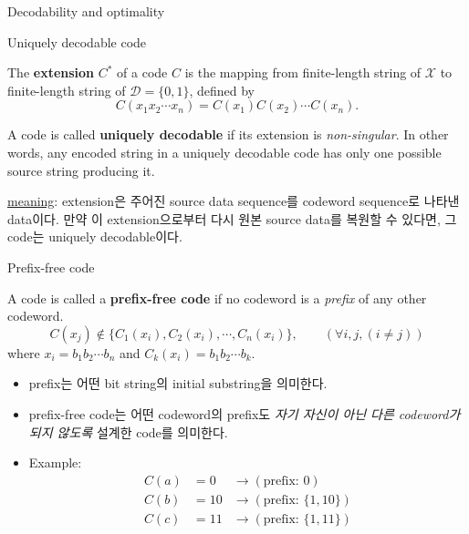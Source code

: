 \documentclass[9pt]{beamer}
\begin{document}
    \begin{section}{Decodability and optimality}
        \begin{frame}{Uniquely decodable code}
            \begin{definition}[extension]
                The \textbf{extension} $C^*$ of a code $C$ is the mapping from finite-length string of $\mathcal X$ to finite-length string of $\mathcal D = \{0, 1\}$, defined by
                $$C(x_1x_2\cdots x_n) = C(x_1)C(x_2) \cdots C(x_n).$$
            \end{definition}
            \begin{definition}
                A code is called \textbf{uniquely decodable} if its extension is \textit{non-singular}. In other words, any encoded string in a uniquely decodable code has only one possible source string producing it.
            \end{definition}
            \checkmark \underline{meaning}: extension은 주어진 source data sequence를 codeword sequence로 나타낸 data이다. 만약 이 extension으로부터 다시 원본 source data를 복원할 수 있다면, 그 code는 uniquely decodable이다.
        \end{frame}

        \begin{frame}{Prefix-free code}
            \begin{definition}
                A code is called a \textbf{prefix-free code} if no codeword is a \textit{prefix} of any other codeword.
                $$ C(x_j) \notin \{C_1(x_i), C_2(x_i), \cdots, C_n(x_i)\}, \qquad  (\forall i, j, (i\ne j))$$
                where $x_i = b_1b_2\cdots b_n$ and $C_k(x_i) = b_1b_2 \cdots b_k$.
            \end{definition}
            \begin{itemize}
                \item prefix는 어떤 bit string의 initial substring을 의미한다. 
                \item prefix-free code는 어떤 codeword의 prefix도 \textit{자기 자신이 아닌 다른 codeword가 되지 않도록} 설계한 code를 의미한다. 
                \item Example:
                $$
                \begin{aligned}
                    C(a)&=0 & \rightarrow (\text{prefix: }0) \\
                    C(b)&=10 & \rightarrow (\text{prefix: }\{1, 10\})\\
                    C(c)&=11 & \rightarrow (\text{prefix: }\{1, 11\})
                \end{aligned}
                $$
            \end{itemize}


\end{frame}
\end{section}
\end{document}

